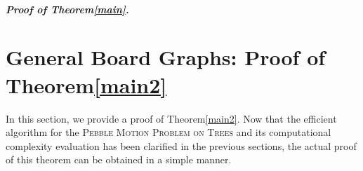 \documentclass[letter,11pt]{article}
\newcommand{\white}{\qquad{\framebox{\rule{0pt}{4pt}}}}
\newcommand{\owari}{\hfill\white}
\theoremstyle{definition}
\theoremstyle{definition}
\DeclareMathOperator{\BT}{BT}
\DeclareMathOperator{\Alg}{Alg}
\newcommand{\1}{\boldmath$~1~$\unboldmath}
\newcommand{\Ord}{\mathrm{O}}
\newcommand{\qedgo}{\vspace{0.35cm}}
\newcommand{\tume}{\hspace*{0.2em}}
\newenvironment{Proofof}[1]{\expandafter
\paragraph{{\it Proof of #1.}}}{\hspace{5mm}\owari\qedgo}
\begin{document}
\begin{Proofof}{Theorem\tume\ref{main}}
\end{Proofof}

\section{General Board Graphs: Proof of Theorem\tume\ref{main2}}\label{Main2Proof}

In this section, we provide a proof of Theorem\tume\ref{main2}. 
Now that the efficient algorithm for the \textsc{Pebble Motion Problem on Trees} and 
its computational complexity evaluation has been clarified in the previous sections, 
the actual proof of this theorem can be obtained in a simple manner. 
\end{document}
